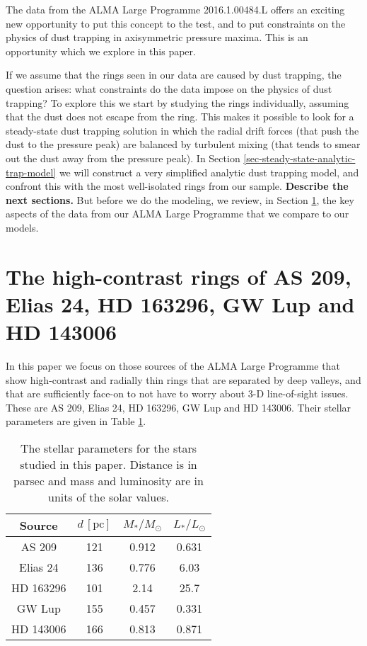 \documentclass{aa}
\begin{document}
The data from the ALMA Large Programme 2016.1.00484.L offers an exciting new
opportunity to put this concept to the test, and to put constraints on the
physics of dust trapping in axisymmetric pressure maxima. This is an opportunity
which we explore in this paper.

If we assume that the rings seen in our data are caused by dust trapping, the
question arises: what constraints do the data impose on the physics of dust
trapping? To explore this we start by studying the rings individually, assuming
that the dust does not escape from the ring. This makes it possible to look for
a steady-state dust trapping solution in which the radial drift forces (that push
the dust to the pressure peak) are balanced by turbulent mixing (that tends to
smear out the dust away from the pressure peak). In Section
\ref{sec-steady-state-analytic-trap-model} we will construct a very simplified
analytic dust trapping model, and confront this with the most well-isolated
rings from our sample. {\bf Describe the next sections.} But before we do the
modeling, we review, in Section \ref{sec-data}, the key aspects of the data from
our ALMA Large Programme that we compare to our models.



\section{The high-contrast rings of AS 209, Elias 24, HD 163296, GW Lup and HD 143006}
\label{sec-data}
%
In this paper we focus on those sources of the ALMA Large Programme
that show high-contrast and radially thin rings that are separated by deep
valleys, and that are sufficiently face-on to not have to worry about 3-D
line-of-sight issues. These are AS 209, Elias 24, HD 163296, GW Lup and
HD 143006. Their stellar parameters are given in Table \ref{tab-stellar-params}.

\begin{table}
\begin{center}
\begin{tabular}{|c|ccc|}
\hline
\hline
Source     & $d\,\mathrm{[pc]}$ & $M_{*}/M_{\odot}$ & $L_{*}/L_{\odot}$ \\
\hline
AS 209     & 121              & 0.912        &  0.631 \\
Elias 24   & 136              & 0.776        &  6.03  \\
HD 163296  & 101              & 2.14         &  25.7  \\
GW Lup     & 155              & 0.457        &  0.331 \\
HD 143006  & 166              & 0.813        &  0.871 \\
\hline
\hline
\end{tabular}
\end{center}
\caption{\label{tab-stellar-params}The stellar parameters for the
  stars studied in this paper. Distance is in parsec and mass and luminosity
  are in units of the solar values.}
\end{table}
\end{document}
